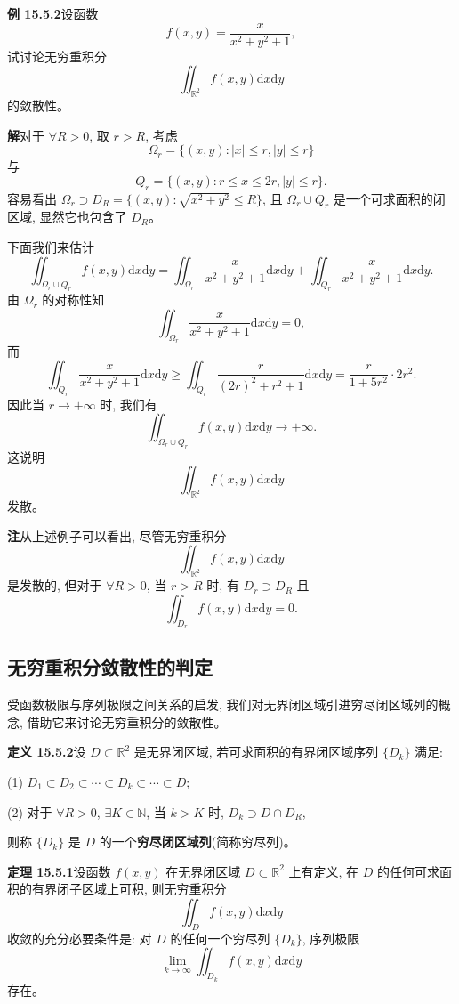 \documentclass[UTF8,12pt,a4paper,fontset=fandol]{ctexart}
\begin{document}
\noindent\textbf{例 15.5.2}\quad 设函数
\[
  f(x,y)=\frac{x}{x^2+y^2+1},
\]
试讨论无穷重积分
\[
  \iint_{\mathbb R^2} f(x,y)\mathrm dx\mathrm dy
\]
的敛散性。

\noindent\textbf{解}\quad 对于 $\forall R>0$, 取 $r>R$, 考虑
\[
  \Omega_r=\{(x,y):|x|\leqslant r, |y|\leqslant r\}
\]
与
\[
  Q_r=\{(x,y):r\leqslant x\leqslant2r, |y|\leqslant r\}.
\]
容易看出 $\Omega_r\supset D_R=\{(x,y):\sqrt{x^2+y^2}\leqslant R\}$, 且 $\Omega_r\cup Q_r$ 是一个可求面积的闭区域, 显然它也包含了 $D_R$。

下面我们来估计
\[
  \iint_{\Omega_r\cup Q_r} f(x,y)\mathrm dx\mathrm dy
  =\iint_{\Omega_r}\frac{x}{x^2+y^2+1}\mathrm dx\mathrm dy
  +\iint_{Q_r}\frac{x}{x^2+y^2+1}\mathrm dx\mathrm dy.
\]
由 $\Omega_r$ 的对称性知
\[
  \iint_{\Omega_r}\frac{x}{x^2+y^2+1}\mathrm dx\mathrm dy=0,
\]
而
\[
  \iint_{Q_r}\frac{x}{x^2+y^2+1}\mathrm dx\mathrm dy
  \geqslant\iint_{Q_r}\frac{r}{(2r)^2+r^2+1}\mathrm dx\mathrm dy
  =\frac{r}{1+5r^2}\cdot2r^2.
\]
因此当 $r\to+\infty$ 时, 我们有
\[
  \iint_{\Omega_r\cup Q_r} f(x,y)\mathrm dx\mathrm dy\to+\infty.
\]
这说明
\[
  \iint_{\mathbb R^2} f(x,y)\mathrm dx\mathrm dy
\]
发散。

\noindent\textbf{注}\quad 从上述例子可以看出, 尽管无穷重积分
\[
  \iint_{\mathbb R^2} f(x,y)\mathrm dx\mathrm dy
\]
是发散的, 但对于 $\forall R>0$, 当 $r>R$ 时, 有 $D_r\supset D_R$ 且
\[
  \iint_{D_r} f(x,y)\mathrm dx\mathrm dy=0.
\]

\subsection{无穷重积分敛散性的判定}

受函数极限与序列极限之间关系的启发, 我们对无界闭区域引进穷尽闭区域列的概念, 借助它来讨论无穷重积分的敛散性。

\noindent\textbf{定义 15.5.2}\quad 设 $D\subset\mathbb R^2$ 是无界闭区域, 若可求面积的有界闭区域序列 $\{D_k\}$ 满足:

(1) $D_1\subset D_2\subset\cdots\subset D_k\subset\cdots\subset D$;

(2) 对于 $\forall R>0$, $\exists K\in\mathbb N$, 当 $k>K$ 时, $D_k\supset D\cap D_R$,

则称 $\{D_k\}$ 是 $D$ 的一个\textbf{穷尽闭区域列}(简称穷尽列)。

\noindent\textbf{定理 15.5.1}\quad 设函数 $f(x,y)$ 在无界闭区域 $D\subset\mathbb R^2$ 上有定义, 在 $D$ 的任何可求面积的有界闭子区域上可积, 则无穷重积分
\[
  \iint_D f(x,y)\mathrm dx\mathrm dy
\]
收敛的充分必要条件是: 对 $D$ 的任何一个穷尽列 $\{D_k\}$, 序列极限
\[
  \lim_{k\to\infty}\iint_{D_k}f(x,y)\mathrm dx\mathrm dy
\]
存在。
\end{document}
